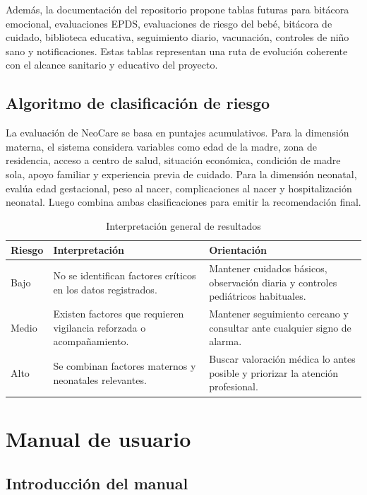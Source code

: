 \documentclass[12pt,letterpaper]{article}
\begin{document}
Además, la documentación del repositorio propone tablas futuras para bitácora emocional, evaluaciones EPDS, evaluaciones de riesgo del bebé, bitácora de cuidado, biblioteca educativa, seguimiento diario, vacunación, controles de niño sano y notificaciones. Estas tablas representan una ruta de evolución coherente con el alcance sanitario y educativo del proyecto.

\subsection{Algoritmo de clasificación de riesgo}

La evaluación de NeoCare se basa en puntajes acumulativos. Para la dimensión materna, el sistema considera variables como edad de la madre, zona de residencia, acceso a centro de salud, situación económica, condición de madre sola, apoyo familiar y experiencia previa de cuidado. Para la dimensión neonatal, evalúa edad gestacional, peso al nacer, complicaciones al nacer y hospitalización neonatal. Luego combina ambas clasificaciones para emitir la recomendación final.

\begin{table}[H]
\centering
\caption{Interpretación general de resultados}
\begin{tabular}{p{}p{}p{}}
\toprule
\textbf{Riesgo} & \textbf{Interpretación} & \textbf{Orientación}\\
\midrule
Bajo & No se identifican factores críticos en los datos registrados. & Mantener cuidados básicos, observación diaria y controles pediátricos habituales.\\
Medio & Existen factores que requieren vigilancia reforzada o acompañamiento. & Mantener seguimiento cercano y consultar ante cualquier signo de alarma.\\
Alto & Se combinan factores maternos y neonatales relevantes. & Buscar valoración médica lo antes posible y priorizar la atención profesional.\\
\bottomrule
\end{tabular}
\end{table}

\section{Manual de usuario}

\subsection{Introducción del manual}
\end{document}
